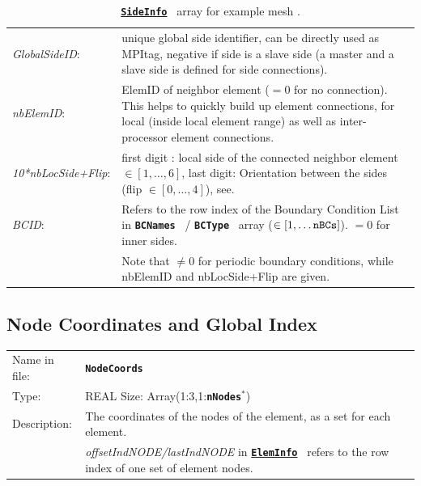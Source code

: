 \documentclass[a4paper,headsepline]{scrreprt}
\newcommand\rf[1]{\prettyref{#1}}
\newcommand\ttbf[1]{\textbf{\texttt{#1}}}
\newcommand\ElemInfo{\hyperlink{ElemInfo}{\ttbf{ElemInfo}}}
\newcommand\SideInfo{\hyperlink{SideInfo}{\ttbf{SideInfo}}}
\newcommand\BCNames{\ttbf{BCNames}}
\newcommand\BCType{\ttbf{BCType}}
\newcommand\nNodes{\ttbf{nNodes}}
\begin{document}
\begin{table}[h!]
\begin{tabularx}{1.0\textwidth}{|lX|}
%
\emph{GlobalSideID}:    & unique global side identifier, can be directly used as MPItag, negative if side is a slave side (a master and a slave side is defined for side connections). \\
%
\emph{nbElemID}:        & ElemID of neighbor element ($=0$ for no connection). This helps to quickly build up element connections, for local (inside local element range) as well as inter-processor element connections. \\
\emph{10*nbLocSide+Flip}:  &  first digit : local side of the connected neighbor element$\in[1,\dots,6]$, last digit: Orientation between the sides (flip $\in [0,\dots,4]$), see\rf{sec:flip}. \\
%
\emph{BCID}:            & Refers to the row index of the Boundary Condition List in \BCNames~ / \BCType~ array ($\in[1,\dots\text{\texttt{nBCs}}]$). $=0$ for inner sides. \\
                        & Note that $\neq 0$ for periodic boundary conditions, while nbElemID and nbLocSide+Flip are given.     \\\hline
\end{tabularx}
\caption{\protect\SideInfo~ array for example mesh \rf{fig:exmesh}.}
\end{table}



\newpage

\hypertarget{NodeInfo}{\subsection{Node Coordinates and Global Index}}
\label{sec:NodeCoords}

\begin{tabularx}{1.0\textwidth}{lX}
Name in  file: & \textbf{\texttt{NodeCoords}}\\
Type:         & REAL \quad Size: Array(1:3,1:\nNodes$^*$) \\
Description:  & The coordinates of the nodes of the element, as a set for each element.  \\
              & \emph{offsetIndNODE/lastIndNODE} in \ElemInfo~ refers to the row index of one set of element nodes. \\
\end{tabularx}
\end{document}
